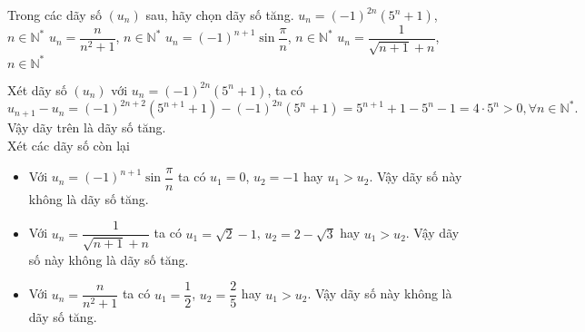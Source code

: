 
\begin{ex}%
	Trong các dãy số $(u_{n})$ sau, hãy chọn dãy số tăng.
	\choice
	{\True $u_{n}=(-1)^{2n}(5^{n}+1)$, $n\in \mathbb N^*$}
	{$u_{n}=\dfrac{n}{n^{2}+1}$, $n\in \mathbb N^*$}
	{$u_{n}=(-1)^{n+1}\sin \dfrac{\pi}{n}$, $n\in \mathbb N^*$}
	{$u_{n}=\dfrac{1}{\sqrt{n+1}+n}$, $n\in \mathbb N^*$}
	\loigiai
	{
		Xét dãy số $(u_n)$ với $u_{n}=(-1)^{2n}(5^{n}+1)$, ta có
		\[u_{n+1}-u_n = (-1)^{2n+2}(5^{n+1}+1)-(-1)^{2n}(5^{n}+1) = 5^{n+1}+1-5^n-1 = 4\cdot 5^n>0, \forall n\in\mathbb{N}^\ast.\]
		Vậy dãy trên là dãy số tăng.\\
		Xét các dãy số còn lại
		\begin{itemize}
			\item Với $u_{n}=(-1)^{n+1}\sin \dfrac{\pi}{n}$ ta có $u_1=0$, $u_2=-1$ hay $u_1>u_2$. Vậy dãy số này không là dãy số tăng.
			\item Với $u_{n}=\dfrac{1}{\sqrt{n+1}+n}$ ta có $u_1=\sqrt{2}-1$, $u_2=2-\sqrt{3}$ hay $u_1>u_2$. Vậy dãy số này không là dãy số tăng.
			\item Với $u_{n}=\dfrac{n}{n^{2}+1}$ ta có $u_1=\dfrac{1}{2}$, $u_2=\dfrac{2}{5}$ hay $u_1>u_2$. Vậy dãy số này không là dãy số tăng.
		\end{itemize}
	}
\end{ex}
